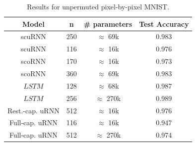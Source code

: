 \documentclass[letterpaper]{article} %
\begin{document}
\begin{table}[h]
\label{t1}
\begin{center}
\caption{Results for unpermuted pixel-by-pixel MNIST.}
\renewcommand{\arraystretch}{1.2}
\begin{tabular}{ | c | c | c | c |} 
\hline
\multicolumn{1}{|c|}{Model}  & 
\multicolumn{1}{|c|}{n} & 
\multicolumn{1}{|c|}{\# parameters}& 
\multicolumn{1}{|c|}{Test Accuracy}
\\ \hline
scuRNN  
& \multicolumn{1}{|c|}{250} 
& \multicolumn{1}{|c|}{$\approx$ 69k}
& \multicolumn{1}{|c|}{0.983} 
\\\hline
scuRNN  
& \multicolumn{1}{|c|}{116} 
& \multicolumn{1}{|c|}{$\approx$ 16k}
& \multicolumn{1}{|c|}{0.976} 
\\\hline
scoRNN 
& \multicolumn{1}{|c|}{170} 
& \multicolumn{1}{|c|}{$\approx$ 16k}
& \multicolumn{1}{|c|}{0.973} 
\\\hline
scoRNN 
& \multicolumn{1}{|c|}{360} 
& \multicolumn{1}{|c|}{$\approx$ 69k}
& \multicolumn{1}{|c|}{0.983} 
\\\hline
$LSTM$  
& \multicolumn{1}{|c|}{128} 
& \multicolumn{1}{|c|}{$\approx$ 68k}
& \multicolumn{1}{|c|}{0.987} 
\\\hline
$LSTM$  
& \multicolumn{1}{|c|}{256} 
& \multicolumn{1}{|c|}{$\approx$ 270k}
& \multicolumn{1}{|c|}{0.989} 
\\\hline
Rest.-cap. uRNN  
& \multicolumn{1}{|c|}{512} 
& \multicolumn{1}{|c|}{$\approx$ 16k}
& \multicolumn{1}{|c|}{0.976} 
\\\hline
Full-cap. uRNN  
& \multicolumn{1}{|c|}{116} 
& \multicolumn{1}{|c|}{$\approx$ 16k}
& \multicolumn{1}{|c|}{0.947} 
\\\hline
Full-cap. uRNN  
& \multicolumn{1}{|c|}{512} 
& \multicolumn{1}{|c|}{$\approx$ 270k}
& \multicolumn{1}{|c|}{0.974} 
\\\hline
\end{tabular}
\end{center}
\end{table}
\end{document}
